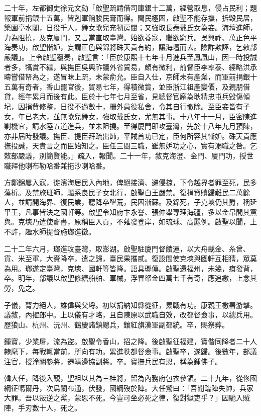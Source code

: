 \begin{pinyinscope}
二十年，左都御史徐元文劾「啟聖疏請借司庫銀十二萬，經營取息，侵占民利；題報軍前捐銀十五萬，皆剋軍餉朘民膏而得。閩民極困，啟聖不能存撫，拆毀民居，築園亭水閣，日役千人，舞女歌兒充牣房闥；又強取長泰戴氏女為妾。海壇進師，力為阻撓，及克廈門，又言當直取臺灣。始欲養寇，繼欲窮兵。吳興祚、萬正色平海奏功，啟聖慚妒，妄謂正色與錦將硃天貴有約，讓海壇而去。險詐欺誣，乞敕部嚴議」。上令啟聖覆奏，啟聖言：「臣於康熙十七年十月進兵至鳳凰山，因一時投誠者多，犒賞不繼，與撫臣吳興祚議外省貿易，頗有微利，前督臣李率泰、經略洪承疇嘗借帑為之，遂冒昧上疏，未蒙俞允。臣自入仕，京師未有產業，而軍前捐銀十五萬有奇者，香山罷官後，貿易七年，得積微貲，並臣浙江祖產變價，及親朋借貸，經年累月而後有此。臣於十七年七月至省，見總督官廨為耿精忠屯兵毀傷傾圮，因捐貲修整，日役不過數十，柵外員役私舍，令其自行撤除。至臣妾皆有子女，年已老大，並無歌兒舞女，強取戴氏女，尤無其事。十八年十一月，臣密陳進剿機宜，請水陸五道進兵，並未阻撓。至得廈門即攻臺灣，先於十八年九月預陳，亦非屆時發議。撫臣、提臣拜疏出師，平賊首功已定，臣何所容其慚妒。硃天貴應撫投誠，天貴言之而臣始知之。臣任三閩三職，雖無妒功之心，實有溺職之咎。乞敕部嚴議，別簡賢能。」疏入，報聞。二十一年，敘克海澄、金門、廈門功，授世職拜他喇布勒哈番兼拖沙喇哈番。

方鄭錦屢入寇，徙濱海居民入內地，俾絕接濟、避侵掠，下令越界者罪至死，民多蕩析。及禁旅班師，驅系良民子女北行，啟聖白王嚴禁。復捐貲贖歸難民二萬餘人，並請開海界、復民業，聽降卒墾荒，民困漸蘇。及錦死，子克塽仍其爵，稱延平王，凡事皆決之國軒等。啟聖令知府卞永譽、張仲舉專理海疆，多以金帛間其黨與。克塽乃遣使齎書，原稱臣入貢，不薙發登岸，如琉球、高麗例。啟聖以聞，上不許，趣水師提督施瑯進徵。

二十二年六月，瑯進攻臺灣，取澎湖。啟聖駐廈門督饋運，以大舟載金、糸曾、貨、米至軍，大賚降卒，遣之歸，臺民果攜貳。復設間使克塽與國軒互相猜，眾莫為用。瑯遂定臺灣，克塽、國軒等皆降。語具瑯傳。啟聖還福州，未幾，疽發背，卒。明年，部議以啟聖修繕船舶、軍械，浮冒帑金四萬七千有奇，應追繳，上念其勞，免之。

子儀，膂力絕人，雄偉與父埒。初以捐納知縣從征，累戰有功。康親王檄署游擊。議敘，內擢郎中。上以儀有才略，且自陳原以武職自效，改都督僉事，以總兵用。歷狼山、杭州、沅州、鶴慶諸鎮總兵，鑲紅旗漢軍副都統。卒，賜祭葬。

鍾寶，少業屠，流為盜。啟聖令香山，招之降。後啟聖征福建，寶偕同降者二十人隸麾下，每戰輒當前，所向有功。累進秩都督僉事。啟聖卒，遂歸。後數年，部議注官，授潼關參將，遷靖邊協副將。卒。寶撫兵民有恩，稱為鍾佛子。

韓大任，降後入覲，聖祖以其為三桂將，留為內務府包衣參領。二十九年，從佟國綱征噶爾丹，次烏闌布通，伏發，國綱歿於陣。大任驚曰：「吾聞臨陣失帥，兵家大罪。吾以叛逆之黨，蒙恩不死。今豈可坐必死之律，復對獄吏乎？」因馳入賊陣，手刃數十人，死之。


\end{pinyinscope}
